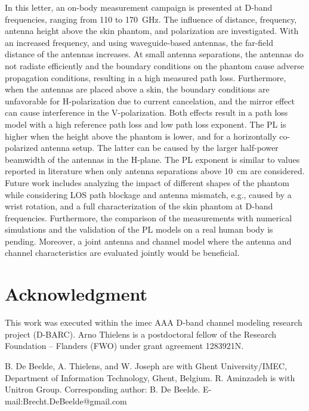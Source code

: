 \documentclass[preprint]{rsl}
\begin{document}
In this letter, an on-body measurement campaign is presented at D-band frequencies, ranging from 110 to 170~GHz. 
The influence of distance, frequency, antenna height above the skin phantom, and polarization are investigated.
With an increased frequency, and using waveguide-based antennas, the far-field distance of the antennas increases. 
At small antenna separations, the antennas do not radiate efficiently and the boundary conditions on the phantom cause adverse propagation conditions, resulting in a high measured path loss. 
Furthermore, when the antennas are placed above a skin, the boundary conditions are unfavorable for H-polarization due to current cancelation, and the mirror effect can cause interference in the V-polarization.
Both effects result in a path loss model with a high reference path loss and low path loss exponent.
The PL is higher when the height above the phantom is lower, and for a horizontally co-polarized antenna setup. 
The latter can be caused by the larger half-power beamwidth of the antennas in the H-plane.
The PL exponent is similar to values reported in literature when only antenna separations above 10~cm are considered.
%
Future work includes analyzing the impact of different shapes of the phantom while considering LOS path blockage and antenna mismatch, e.g., caused by a wrist rotation, and a full characterization of the skin phantom at D-band frequencies. 
Furthermore, the comparison of the measurements with numerical simulations and the validation of the PL models on a real human body is pending. 
Moreover, a joint antenna and channel model where the antenna and channel characteristics are evaluated jointly would be beneficial.

\section{Acknowledgment}

This work was executed within the imec AAA D-band channel modeling research project (D-BARC). 
Arno Thielens is a postdoctoral fellow of the Research Foundation – Flanders (FWO) under grant agreement 1283921N.
\vspace{3pt}

\suppressfloats


\suppressfloats

\vspace{7pt}

%
%
\noindent\small
B. De Beelde, A. Thielens, and W. Joseph are with Ghent University/IMEC, Department of Information Technology, Ghent, Belgium. 
R. Aminzadeh is with Unitron Group. 
Corresponding author: B. De Beelde. 
E-mail:Brecht.DeBeelde@gmail.com
\end{document}
